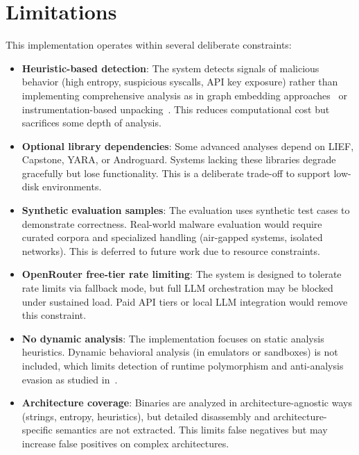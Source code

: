 \documentclass[11pt]{article}
\begin{document}
\section{Limitations}
This implementation operates within several deliberate constraints:
\begin{itemize}[leftmargin=*]
  \item \textbf{Heuristic-based detection}: The system detects signals of malicious behavior (high entropy, suspicious syscalls, API key exposure) rather than implementing comprehensive analysis as in graph embedding approaches~\cite{gemini2018} or instrumentation-based unpacking~\cite{polyunpack2007}. This reduces computational cost but sacrifices some depth of analysis.
  \item \textbf{Optional library dependencies}: Some advanced analyses depend on LIEF, Capstone, YARA, or Androguard. Systems lacking these libraries degrade gracefully but lose functionality. This is a deliberate trade-off to support low-disk environments.
  \item \textbf{Synthetic evaluation samples}: The evaluation uses synthetic test cases to demonstrate correctness. Real-world malware evaluation would require curated corpora and specialized handling (air-gapped systems, isolated networks). This is deferred to future work due to resource constraints.
  \item \textbf{OpenRouter free-tier rate limiting}: The system is designed to tolerate rate limits via fallback mode, but full LLM orchestration may be blocked under sustained load. Paid API tiers or local LLM integration would remove this constraint.
  \item \textbf{No dynamic analysis}: The implementation focuses on static analysis heuristics. Dynamic behavioral analysis (in emulators or sandboxes) is not included, which limits detection of runtime polymorphism and anti-analysis evasion as studied in~\cite{polyunpack2007}.
  \item \textbf{Architecture coverage}: Binaries are analyzed in architecture-agnostic ways (strings, entropy, heuristics), but detailed disassembly and architecture-specific semantics are not extracted. This limits false negatives but may increase false positives on complex architectures.
\end{itemize}
\end{document}
